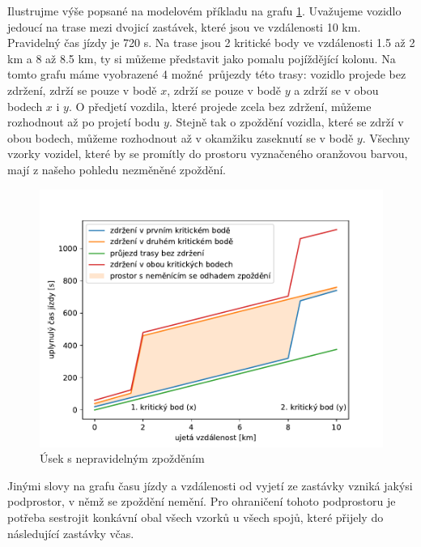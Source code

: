 \bigbreak

Ilustrujme výše popsané na modelovém příkladu na grafu \ref{fig:concave_hull}. Uvažujeme vozidlo jedoucí na trase mezi dvojicí zastávek, které jsou ve vzdálenosti 10 km. Pravidelný čas jízdy je 720 s. Na trase jsou 2 kritické body ve vzdálenosti 1.5 až 2 km a 8 až 8.5 km, ty si můžeme představit jako pomalu pojíždějící kolonu. Na tomto grafu máme vyobrazené 4 možné průjezdy této trasy: vozidlo projede bez zdržení, zdrží se pouze v bodě $x$, zdrží se pouze v bodě $y$ a zdrží se v obou bodech $x$ i $y$. O předjetí vozdila, které projede zcela bez zdržení, můžeme rozhodnout až po projetí bodu $y$. Stejně tak o zpoždění vozidla, které se zdrží v obou bodech, můžeme rozhodnout až v okamžiku zaseknutí se v bodě $y$. Všechny vzorky vozidel, které by se promítly do prostoru vyznačeného oranžovou barvou, mají z našeho pohledu nezměněné zpoždění.


\begin{figure}
\centering
  \includegraphics[width=\linewidth]{../img/concave_hull}
  \caption{Úsek s nepravidelným zpožděním}
  \label{fig:concave_hull}
\end{figure}


\bigbreak


Jinými slovy na grafu času jízdy a vzdálenosti od vyjetí ze zastávky vzniká jakýsi podprostor, v němž se zpoždění nemění. Pro ohraničení tohoto podprostoru je potřeba sestrojit konkávní obal všech vzorků u všech spojů, které přijely do následující zastávky včas.


\bigbreak


